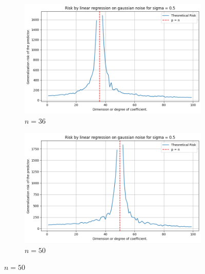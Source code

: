 \documentclass[10pt,oneside,oldfontcommands,dvipsnames,article]{memoir}
\begin{document}
\begin{figure}[htb]
  \hfill
  \begin{subfigure}[b]{\imgwidth}
    \includegraphics[width=\linewidth]{img/descent_lin_reg_3.png}
    \caption{$n=36$}\label{fig:1c}
  \end{subfigure}%
  \hfill
  \begin{subfigure}[b]{\imgwidth}
    \includegraphics[width=\linewidth]{img/descent_lin_reg_4.png}
    \caption{$n=50$}\label{fig:1d}
  \end{subfigure}

  \medskip


\end{figure}
\end{document}
